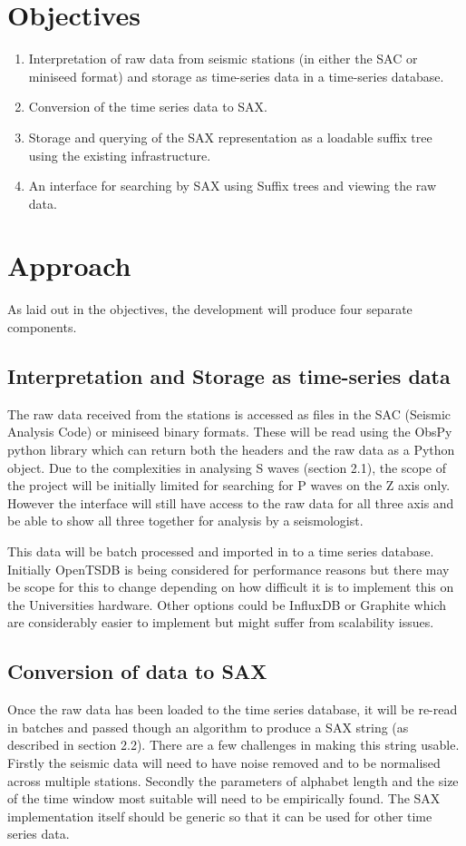 \documentclass[11pt]{scrartcl}
\begin{document}
\section{Objectives}
\begin{enumerate}
	\item Interpretation of raw data from seismic stations (in either the SAC or miniseed format) and storage as time-series data in a time-series database.
	\item Conversion of the time series data to SAX.
	\item Storage and querying of the SAX representation as a loadable suffix tree using the existing infrastructure.
	\item An interface for searching by SAX using Suffix trees and viewing the raw data.
\end{enumerate}

\section{Approach}
	As laid out in the objectives, the development will produce four separate components.
	
\subsection{Interpretation and Storage as time-series data}
	The raw data received from the stations is accessed as files in the SAC (Seismic Analysis Code) or miniseed binary formats.  These will be read using the ObsPy python library which can return both the headers and the raw data as a Python object.  Due to the complexities in analysing S waves (section 2.1), the scope of the project will be initially limited for searching for P waves on the Z axis only.  However the interface will still have access to the raw data for all three axis and be able to show all three together for analysis by a seismologist.
	
	This data will be batch processed and imported in to a time series database.  Initially OpenTSDB is being considered for performance reasons but there may be scope for this to change depending on how difficult it is to implement this on the Universities hardware.  Other options could be InfluxDB or Graphite which are considerably easier to implement but might suffer from scalability issues.

\subsection{Conversion of data to SAX}
	Once the raw data has been loaded to the time series database, it will be re-read in batches and passed though an algorithm to produce a SAX string (as described in section 2.2).  There are a few challenges in making this string usable.  Firstly the seismic data will need to have noise removed and to be normalised across multiple stations.  Secondly the parameters of alphabet length and the size of the time window most suitable will need to be empirically found.  The SAX implementation itself should be generic so that it can be used for other time series data.
	
\end{document}
